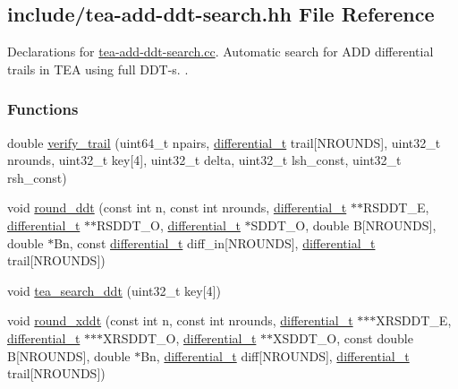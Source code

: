 \hypertarget{tea-add-ddt-search_8hh}{\subsection{include/tea-\/add-\/ddt-\/search.hh \-File \-Reference}
\label{tea-add-ddt-search_8hh}
}


\-Declarations for \hyperlink{tea-add-ddt-search_8cc}{tea-\/add-\/ddt-\/search.\-cc}. \-Automatic search for \-A\-D\-D differential trails in \-T\-E\-A using full \-D\-D\-T-\/s. .  


\subsubsection*{\-Functions}
\begin{DoxyCompactItemize}
\item 
double \hyperlink{tea-add-ddt-search_8hh_ac37bdb6b6b92aab26ba068877b6591e4}{verify\-\_\-trail} (uint64\-\_\-t npairs, \hyperlink{structdifferential__t}{differential\-\_\-t} trail\mbox{[}\-N\-R\-O\-U\-N\-D\-S\mbox{]}, uint32\-\_\-t nrounds, uint32\-\_\-t key\mbox{[}4\mbox{]}, uint32\-\_\-t delta, uint32\-\_\-t lsh\-\_\-const, uint32\-\_\-t rsh\-\_\-const)
\item 
void \hyperlink{tea-add-ddt-search_8hh_a06a1cdac8a817642490ecdb7371de378}{round\-\_\-ddt} (const int n, const int nrounds, \hyperlink{structdifferential__t}{differential\-\_\-t} $\ast$$\ast$\-R\-S\-D\-D\-T\-\_\-\-E, \hyperlink{structdifferential__t}{differential\-\_\-t} $\ast$$\ast$\-R\-S\-D\-D\-T\-\_\-\-O, \hyperlink{structdifferential__t}{differential\-\_\-t} $\ast$\-S\-D\-D\-T\-\_\-\-O, double \-B\mbox{[}\-N\-R\-O\-U\-N\-D\-S\mbox{]}, double $\ast$\-Bn, const \hyperlink{structdifferential__t}{differential\-\_\-t} diff\-\_\-in\mbox{[}\-N\-R\-O\-U\-N\-D\-S\mbox{]}, \hyperlink{structdifferential__t}{differential\-\_\-t} trail\mbox{[}\-N\-R\-O\-U\-N\-D\-S\mbox{]})
\item 
void \hyperlink{tea-add-ddt-search_8hh_a5519276063a08ee4fc0d2f580899b9c9}{tea\-\_\-search\-\_\-ddt} (uint32\-\_\-t key\mbox{[}4\mbox{]})
\item 
void \hyperlink{tea-add-ddt-search_8hh_ae5a533dd8d6c3d5712343627e0156e6f}{round\-\_\-xddt} (const int n, const int nrounds, \hyperlink{structdifferential__t}{differential\-\_\-t} $\ast$$\ast$$\ast$\-X\-R\-S\-D\-D\-T\-\_\-\-E, \hyperlink{structdifferential__t}{differential\-\_\-t} $\ast$$\ast$$\ast$\-X\-R\-S\-D\-D\-T\-\_\-\-O, \hyperlink{structdifferential__t}{differential\-\_\-t} $\ast$$\ast$\-X\-S\-D\-D\-T\-\_\-\-O, const double \-B\mbox{[}\-N\-R\-O\-U\-N\-D\-S\mbox{]}, double $\ast$\-Bn, \hyperlink{structdifferential__t}{differential\-\_\-t} diff\mbox{[}\-N\-R\-O\-U\-N\-D\-S\mbox{]}, \hyperlink{structdifferential__t}{differential\-\_\-t} trail\mbox{[}\-N\-R\-O\-U\-N\-D\-S\mbox{]})
$$
\end{DoxyCompactItemize}
